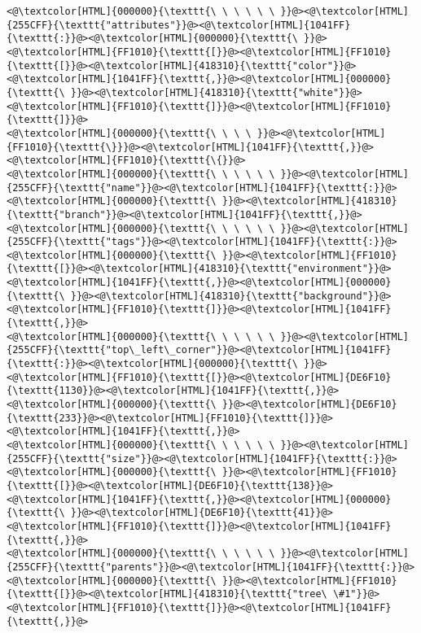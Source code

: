 \begin{lstlisting}
<@\textcolor[HTML]{000000}{\texttt{\ \ \ \ \ \ }}@><@\textcolor[HTML]{255CFF}{\texttt{"attributes"}}@><@\textcolor[HTML]{1041FF}{\texttt{:}}@><@\textcolor[HTML]{000000}{\texttt{\ }}@><@\textcolor[HTML]{FF1010}{\texttt{[}}@><@\textcolor[HTML]{FF1010}{\texttt{[}}@><@\textcolor[HTML]{418310}{\texttt{"color"}}@><@\textcolor[HTML]{1041FF}{\texttt{,}}@><@\textcolor[HTML]{000000}{\texttt{\ }}@><@\textcolor[HTML]{418310}{\texttt{"white"}}@><@\textcolor[HTML]{FF1010}{\texttt{]}}@><@\textcolor[HTML]{FF1010}{\texttt{]}}@>
<@\textcolor[HTML]{000000}{\texttt{\ \ \ \ }}@><@\textcolor[HTML]{FF1010}{\texttt{\}}}@><@\textcolor[HTML]{1041FF}{\texttt{,}}@> <@\textcolor[HTML]{FF1010}{\texttt{\{}}@>
<@\textcolor[HTML]{000000}{\texttt{\ \ \ \ \ \ }}@><@\textcolor[HTML]{255CFF}{\texttt{"name"}}@><@\textcolor[HTML]{1041FF}{\texttt{:}}@><@\textcolor[HTML]{000000}{\texttt{\ }}@><@\textcolor[HTML]{418310}{\texttt{"branch"}}@><@\textcolor[HTML]{1041FF}{\texttt{,}}@>
<@\textcolor[HTML]{000000}{\texttt{\ \ \ \ \ \ }}@><@\textcolor[HTML]{255CFF}{\texttt{"tags"}}@><@\textcolor[HTML]{1041FF}{\texttt{:}}@><@\textcolor[HTML]{000000}{\texttt{\ }}@><@\textcolor[HTML]{FF1010}{\texttt{[}}@><@\textcolor[HTML]{418310}{\texttt{"environment"}}@><@\textcolor[HTML]{1041FF}{\texttt{,}}@><@\textcolor[HTML]{000000}{\texttt{\ }}@><@\textcolor[HTML]{418310}{\texttt{"background"}}@><@\textcolor[HTML]{FF1010}{\texttt{]}}@><@\textcolor[HTML]{1041FF}{\texttt{,}}@>
<@\textcolor[HTML]{000000}{\texttt{\ \ \ \ \ \ }}@><@\textcolor[HTML]{255CFF}{\texttt{"top\_left\_corner"}}@><@\textcolor[HTML]{1041FF}{\texttt{:}}@><@\textcolor[HTML]{000000}{\texttt{\ }}@><@\textcolor[HTML]{FF1010}{\texttt{[}}@><@\textcolor[HTML]{DE6F10}{\texttt{1130}}@><@\textcolor[HTML]{1041FF}{\texttt{,}}@><@\textcolor[HTML]{000000}{\texttt{\ }}@><@\textcolor[HTML]{DE6F10}{\texttt{233}}@><@\textcolor[HTML]{FF1010}{\texttt{]}}@><@\textcolor[HTML]{1041FF}{\texttt{,}}@>
<@\textcolor[HTML]{000000}{\texttt{\ \ \ \ \ \ }}@><@\textcolor[HTML]{255CFF}{\texttt{"size"}}@><@\textcolor[HTML]{1041FF}{\texttt{:}}@><@\textcolor[HTML]{000000}{\texttt{\ }}@><@\textcolor[HTML]{FF1010}{\texttt{[}}@><@\textcolor[HTML]{DE6F10}{\texttt{138}}@><@\textcolor[HTML]{1041FF}{\texttt{,}}@><@\textcolor[HTML]{000000}{\texttt{\ }}@><@\textcolor[HTML]{DE6F10}{\texttt{41}}@><@\textcolor[HTML]{FF1010}{\texttt{]}}@><@\textcolor[HTML]{1041FF}{\texttt{,}}@>
<@\textcolor[HTML]{000000}{\texttt{\ \ \ \ \ \ }}@><@\textcolor[HTML]{255CFF}{\texttt{"parents"}}@><@\textcolor[HTML]{1041FF}{\texttt{:}}@><@\textcolor[HTML]{000000}{\texttt{\ }}@><@\textcolor[HTML]{FF1010}{\texttt{[}}@><@\textcolor[HTML]{418310}{\texttt{"tree\ \#1"}}@><@\textcolor[HTML]{FF1010}{\texttt{]}}@><@\textcolor[HTML]{1041FF}{\texttt{,}}@>

\end{lstlisting}
